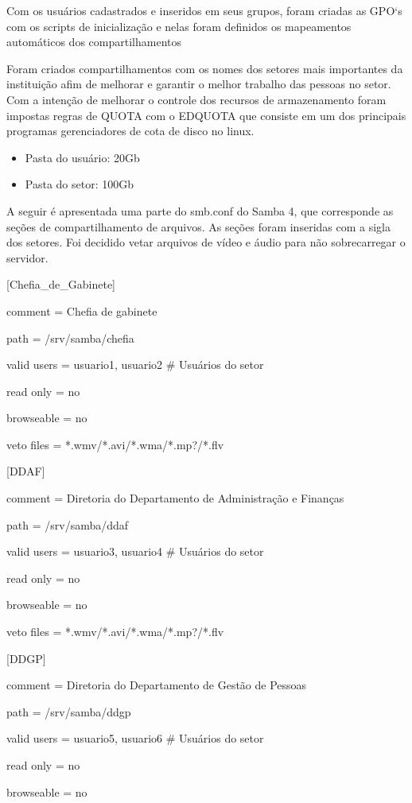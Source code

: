 Com os usuários cadastrados e inseridos em seus grupos, foram criadas as GPO`s com os scripts de inicialização e nelas foram definidos os mapeamentos automáticos dos compartilhamentos

Foram criados compartilhamentos com os nomes dos setores mais importantes da instituição afim de melhorar e garantir o melhor trabalho das pessoas no setor. Com a intenção de melhorar o controle dos recursos de armazenamento foram impostas regras de QUOTA com o EDQUOTA que consiste em um dos principais programas gerenciadores de cota de disco no linux.

\begin{itemize}
		\item {Pasta do usuário: 20Gb}
		\item {Pasta do setor: 100Gb}
\end{itemize}

A seguir é apresentada uma parte do smb.conf do Samba 4, que corresponde as seções de compartilhamento de arquivos. As seções foram inseridas com a sigla dos setores. Foi decidido vetar arquivos de vídeo e áudio para não sobrecarregar o servidor.

[Chefia\_de\_Gabinete]

comment = Chefia de gabinete

path = /srv/samba/chefia

valid users = usuario1, usuario2 \# Usuários do setor

read only = no

browseable = no

veto files = *.wmv/*.avi/*.wma/*.mp?/*.flv

[DDAF] 

comment = Diretoria do Departamento de Administração e Finanças

path = /srv/samba/ddaf

valid users = usuario3, usuario4 \# Usuários do setor

read only = no

browseable = no

veto files = *.wmv/*.avi/*.wma/*.mp?/*.flv

[DDGP] 

comment = Diretoria do Departamento de Gestão de Pessoas

path = /srv/samba/ddgp

valid users = usuario5, usuario6 \# Usuários do setor

read only = no

browseable = no

